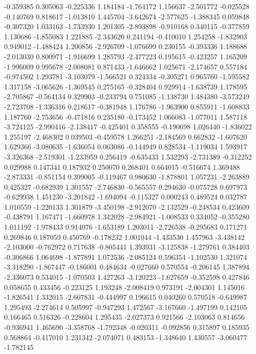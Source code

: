 -0.359385
0.305063
-0.225336
1.184184
-1.764172
1.156637
-2.501772
-0.025528
-0.140769
0.818617
-1.013810
1.445704
-3.642674
-2.577625
-1.388345
0.059848
-0.307320
1.033163
-1.733930
1.201305
-2.893898
-0.910168
0.340115
-0.377859
1.130686
-1.855083
1.221885
-2.343620
0.241194
-0.410010
1.254258
-1.832903
0.949012
-1.488424
1.200856
-2.926709
-1.076699
0.230155
-0.393336
1.188688
-2.013030
0.800971
-1.916699
1.285793
-2.477223
0.195615
-0.423257
1.165209
-1.996009
0.995678
-2.008081
0.871433
-1.646662
1.025671
-2.174657
0.557184
-0.974502
1.293781
-3.103079
-1.566521
0.324334
-0.305271
0.965760
-1.595582
1.317158
-3.065626
-1.369545
0.275165
-0.328404
0.929914
-1.638739
1.178595
-2.705867
-0.564134
0.329903
-0.233794
0.751085
-1.138730
1.484380
-3.573249
-2.723708
-1.336316
0.218617
-0.381948
1.176786
-1.963900
0.855911
-1.608833
1.187760
-2.753656
-0.471816
0.235180
-0.173452
1.066083
-1.077011
1.587118
-3.724125
-2.990416
-2.138417
-0.425401
0.358555
-0.190698
1.026440
-1.836022
1.255197
-2.468302
0.039503
-0.459578
1.266251
-2.184569
0.662832
-1.607620
1.629366
-3.080635
-1.636054
0.063086
-0.144949
0.828534
-1.119034
1.593917
-3.326368
-2.519301
-1.233959
0.256419
-0.635433
1.532293
-2.731389
-0.312252
0.029988
0.147341
0.187932
0.250070
0.268401
0.664015
-0.516674
1.369488
-2.873331
-0.851154
0.399005
-0.119467
0.980630
-1.878801
1.057231
-2.263889
0.425327
-0.682939
1.301557
-2.746830
-0.565557
0.294630
-0.075728
0.697973
-0.629938
1.451230
-3.201842
-1.694094
-0.115327
0.000243
0.489524
0.032787
1.010559
-1.220133
1.301879
-3.450198
-2.912070
-2.132529
-0.248534
0.423609
-0.438791
1.167471
-1.660978
1.342028
-2.984921
-1.008533
0.334052
-0.355280
1.011192
-1.978433
0.914076
-1.653189
1.203011
-2.726538
-0.295683
0.171271
0.269846
0.187059
0.450769
-0.178232
1.001044
-1.433530
1.457963
-3.438142
-2.103000
-0.762972
0.717638
-0.805441
1.393931
-3.125838
-1.279761
0.384403
-0.306866
1.064698
-1.877891
1.072536
-2.085124
0.596354
-1.102530
1.321074
-3.318290
-1.867447
-0.186001
0.484634
-0.027660
0.570554
-0.206145
1.387894
-2.336073
0.534015
-1.070503
1.427263
-3.120223
-1.627659
-0.352598
0.427846
0.058655
0.433456
-0.223125
1.193248
-2.008419
0.973191
-2.004301
1.145016
-1.826541
1.332015
-2.607831
-0.444997
0.196615
0.040260
0.570518
-0.649987
1.295493
-2.274614
0.505997
-0.947293
1.472567
-3.167660
-1.497199
0.142105
0.166465
0.516326
-0.228604
1.295435
-2.027373
0.921566
-2.103063
0.814656
-0.936941
1.465690
-3.358768
-1.792348
-0.020311
-0.092856
0.315897
0.185935
0.568864
-0.417010
1.231342
-2.074071
0.483153
-1.348640
1.430557
-3.060477
-1.782145
